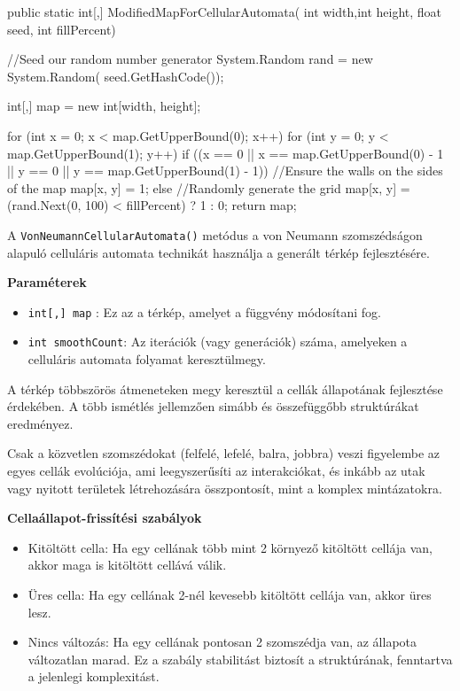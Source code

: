 \begin{java}
 public static int[,] ModifiedMapForCellularAutomata(
    int width,int height, float seed, int fillPercent)
{
    //Seed our random number generator
    System.Random rand = new System.Random(
        seed.GetHashCode());

    int[,] map = new int[width, height];

    for (int x = 0; x < 
        map.GetUpperBound(0); x++)
    {
        for (int y = 0; y < map.GetUpperBound(1); y++)
        {
            if ((x == 0 || x == map.GetUpperBound(0) - 1 || 
                y == 0 || y == map.GetUpperBound(1) - 1))
            {
                //Ensure the walls on the sides of the map
                map[x, y] = 1;
            }
            else
            {
                //Randomly generate the grid
                map[x, y] = (rand.Next(0, 100) < 
                    fillPercent) ? 1 : 0;
            }
        }
    }
    return map;
}
\end{java}

A \texttt{VonNeumannCellularAutomata()} metódus a von Neumann szomszédságon alapuló celluláris automata technikát használja a generált térkép fejlesztésére.

\textbf{Paraméterek}
\begin{itemize}
\item \texttt{int[,] map} : Ez az a térkép, amelyet a függvény módosítani fog.
\item \texttt{int smoothCount}: Az iterációk (vagy generációk) száma, amelyeken a celluláris automata folyamat keresztülmegy.
\end{itemize}

A térkép többszörös átmeneteken megy keresztül a cellák állapotának fejlesztése érdekében. A több ismétlés jellemzően simább és összefüggőbb struktúrákat eredményez.

Csak a közvetlen szomszédokat (felfelé, lefelé, balra, jobbra) veszi figyelembe az egyes cellák evolúciója, ami leegyszerűsíti az interakciókat, és inkább az utak vagy nyitott területek létrehozására összpontosít, mint a komplex mintázatokra.

\textbf{Cellaállapot-frissítési szabályok}
\begin{itemize}
\item Kitöltött cella: Ha egy cellának több mint 2 környező kitöltött cellája van, akkor maga is kitöltött cellává válik.
\item Üres cella: Ha egy cellának 2-nél kevesebb kitöltött cellája van, akkor üres lesz.
\item Nincs változás: Ha egy cellának pontosan 2 szomszédja van, az állapota változatlan marad. Ez a szabály stabilitást biztosít a struktúrának, fenntartva a jelenlegi komplexitást.
\end{itemize}

